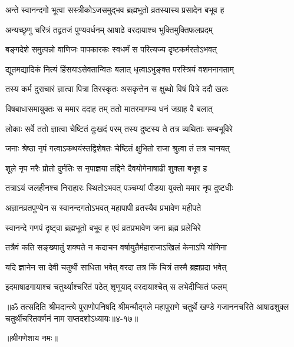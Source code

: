 \twolineshloka
{अन्ते स्वानन्दगो भूत्वा सस्त्रीकोऽजसमुद्भव}
{ब्रह्मभूतो व्रतस्यास्य प्रसादेन बभूव ह} %

\twolineshloka
{अन्यच्छृणु चरित्रं तद्व्रतजं पुण्यवर्धनम्}
{आषाढे वरदायाश्च भुक्तिमुक्तिफलप्रदम्} %

\twolineshloka
{बङ्गदेशे समुत्पन्नो वाणिजः पापकारकः}
{स्वधर्मं स परित्यज्य दृष्टकर्मरतोऽभवत्} %

\twolineshloka
{द्यूतमद्यादिकं नित्यं हिंसयाऽसेवतान्वितः}
{बलात् धृत्वाऽभुङ्क्त परस्त्रियं वशमनागताम्} %

\twolineshloka
{तस्य कर्म दुराचारं ज्ञात्वा पित्रा तिरस्कृतः}
{असकृत्तेन स क्षुब्धो विषं पित्रे ददौ खलः} %

\twolineshloka
{विषबाधासमायुक्तः स ममार ददाह तम्}
{ततो मातरमागम्य धनं जग्राह वै बलात्} %

\twolineshloka
{लोकाः सर्वे ततो ज्ञात्वा चेष्टितं दुःखदं परम्}
{तस्य दुष्टस्य ते तत्र व्यथिताः सम्बभूविरे} %

\twolineshloka
{जनाः श्रेष्ठा नृपं गत्वाऽकथयंस्तद्विशेषतः}
{चेष्टितं क्षुभितो राजा श्रुत्वा तं तत्र चानयत्} %

\twolineshloka
{शूले नृप नरैः प्रोतो दुर्मतिः स नृपाज्ञया}
{तद्दिने दैवयोगेनाषाढी शुक्ला बभूव ह} %

\twolineshloka
{तत्राऽयं जलहीनश्च निराहारः स्थितोऽभवत्}
{पञ्चम्यां पीडया युक्तो ममार नृप दुष्टधीः} %

\twolineshloka
{अज्ञानव्रतपुण्येन स स्वानन्दगतोऽभवत्}
{महापापी व्रतस्यैव प्रभावेण महीपते} %

\twolineshloka
{स्वानन्दे गणपं दृष्ट्वा ब्रह्मभूतो बभूव ह}
{एवं व्रतप्रभावेण जना ब्रह्म प्रलेभिरे} %

\twolineshloka
{तत्रैवं कति सङ्ख्यातुं शक्यते न कदाचन}
{वर्षायुतैर्महाराजाऽखिलं केनाऽपि योगिना} %

\twolineshloka
{यदि ज्ञानेन सा देवी चतुर्थी साधिता भवेत्}
{वरदा तत्र किं चित्रं तस्मै ब्रह्मप्रदा भवेत्} %

\twolineshloka
{इदमाषाढगायाश्च चतुर्थ्याश्चरितं पठेत्}
{श‍ृणुयाद् वरदायाश्चेत् स लभेदीप्सितं फलम्} %

॥ॐ तत्सदिति श्रीमदान्त्ये पुराणोपनिषदि श्रीमन्मौद्गले महापुराणे चतुर्थे खण्डे गजाननचरिते आषाढशुक्ल चतुर्थीचरितवर्णनं नाम सप्तदशोऽध्यायः॥४-१७॥


\label{sec:shravana-shukla-chaturthi-mahatmya-varnanam}

\centerline{॥श्रीगणेशाय नमः॥}


